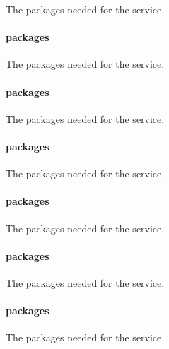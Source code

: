 
The packages needed for the  service.

\paragraph{packages}


The packages needed for the  service.

\paragraph{packages}


The packages needed for the  service.

\paragraph{packages}


The packages needed for the  service.

\paragraph{packages}


The packages needed for the  service.

\paragraph{packages}


The packages needed for the  service.

\paragraph{packages}


The packages needed for the  service.

